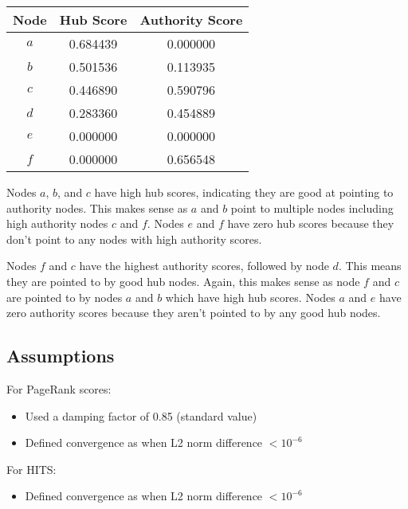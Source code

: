 \documentclass{article}
\begin{document}
\begin{center}
\begin{tabular}{|c|c|c|}
\hline
\textbf{Node} & \textbf{Hub Score} & \textbf{Authority Score} \\
\hline
$a$ & 0.684439 & 0.000000 \\
$b$ & 0.501536 & 0.113935 \\
$c$ & 0.446890 & 0.590796 \\
$d$ & 0.283360 & 0.454889 \\
$e$ & 0.000000 & 0.000000 \\
$f$ & 0.000000 & 0.656548 \\
\hline
\end{tabular}
\end{center}

Nodes $a$, $b$, and $c$ have high hub scores, indicating they are good at pointing to authority nodes. This makes sense as $a$ and $b$ point to multiple nodes including high authority nodes $c$ and $f$. Nodes $e$ and $f$ have zero hub scores because they don't point to any nodes with high authority scores.

Nodes $f$ and $c$ have the highest authority scores, followed by node $d$. This means they are pointed to by good hub nodes. Again, this makes sense as node $f$ and $c$ are pointed to by nodes $a$ and $b$ which have high hub scores. Nodes $a$ and $e$ have zero authority scores because they aren't pointed to by any good hub nodes.

\subsection{Assumptions}
For PageRank scores:
\begin{itemize}
    \item Used a damping factor of 0.85 (standard value)
    \item Defined convergence as when L2 norm difference $< 10^{-6}$
\end{itemize}

For HITS:
\begin{itemize}
    \item Defined convergence as when L2 norm difference $< 10^{-6}$
\end{itemize}
\end{document}
